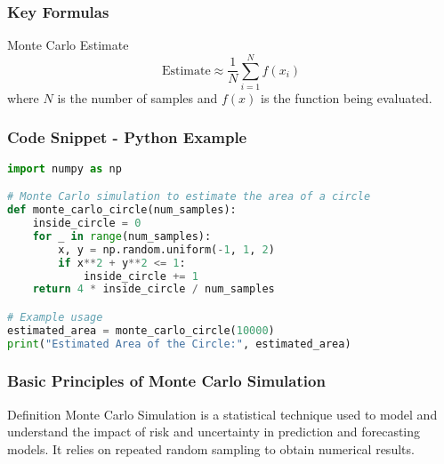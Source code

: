 \documentclass[aspectratio=169]{beamer}
\begin{document}
\begin{frame}[fragile]
  \frametitle{Key Formulas}
  \begin{block}{Monte Carlo Estimate}
    \[
    \text{Estimate} \approx \frac{1}{N} \sum_{i=1}^{N} f(x_i)
    \]
    where \(N\) is the number of samples and \(f(x)\) is the function being evaluated.
  \end{block}
\end{frame}

\begin{frame}[fragile]
  \frametitle{Code Snippet - Python Example}
  \begin{lstlisting}[language=Python]
import numpy as np

# Monte Carlo simulation to estimate the area of a circle
def monte_carlo_circle(num_samples):
    inside_circle = 0
    for _ in range(num_samples):
        x, y = np.random.uniform(-1, 1, 2)
        if x**2 + y**2 <= 1:
            inside_circle += 1
    return 4 * inside_circle / num_samples

# Example usage
estimated_area = monte_carlo_circle(10000)
print("Estimated Area of the Circle:", estimated_area)
  \end{lstlisting}
\end{frame}

\begin{frame}[fragile]
  \frametitle{Basic Principles of Monte Carlo Simulation}
  \begin{block}{Definition}
    Monte Carlo Simulation is a statistical technique used to model and understand the impact of risk and uncertainty in prediction and forecasting models. It relies on repeated random sampling to obtain numerical results.
  \end{block}
\end{frame}
\end{document}
